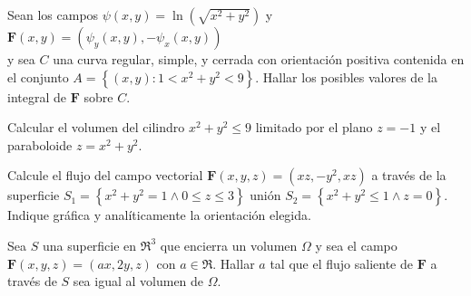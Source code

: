 
\begin{question}
    Sean los campos $\psi (x,y) = \ln(\sqrt{x^2+y^2})$ y $\boldsymbol{F}(x,y)= \left(\psi_y(x,y), -\psi_x(x,y)\right)$
    \\y sea $C$ una curva regular, simple, y cerrada con orientación positiva contenida en el conjunto
    $A=\left\{(x,y): 1 < x^2+y^2 < 9 \right\}$. Hallar los posibles valores de la integral de $\boldsymbol{F}$ sobre $C$.
\end{question}


\begin{question}
    Calcular el volumen del cilindro $x^2+y^2 \leq 9$ limitado por el plano $z=-1$ y el
    paraboloide $z=x^2+y^2$.
\end{question}


\begin{question}
    Calcule el flujo del campo vectorial $\boldsymbol{F}(x,y,z)= (xz,-y^2,xz)$ a través de la superficie
    $S_1=\left\{x^2+y^2=1 \land 0\leq z \leq 3\right\}$ unión $S_2=\left\{x^2+y^2\leq 1 \land z=0\right\}$.
    Indique gráfica y analíticamente la orientación elegida.
\end{question}



\begin{question}
    Sea $S$ una superficie en $\Re^3$ que encierra un volumen $\Omega$ y sea el campo
    $\boldsymbol{F}(x,y,z)=(ax,2y,z)$ con $a \in \Re$. Hallar $a$ tal que el flujo saliente de $\boldsymbol{F}$ a través de $S$
    sea igual al volumen de $\Omega$.
\end{question}

